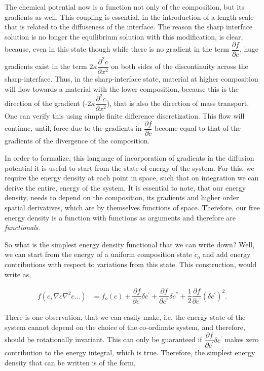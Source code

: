 \documentclass[english]{iambook}
\begin{document}
The chemical potential now is a function not only of the composition, 
but its gradients as well. This coupling is essential, in the introduction
of a length scale that is related to the diffuseness of the interface. 
The reason the sharp interface solution is no longer the equilibrium solution 
with this modification, is clear, because, even in this state though while 
there is no gradient in the 
term $\dfrac{\partial f}{\partial c}$, huge gradients exist in the term 
$2\kappa\dfrac{\partial ^{2}c}{\partial x^{2}}$ on both sides of the discontinuity
across the sharp-interface. Thus, in the sharp-interface state, material at higher 
composition will flow towards a material with the lower composition, because this is the direction of
the gradient (-$2\kappa\dfrac{\partial ^{2}c}{\partial x^{2}}$), that
is also the direction of mass transport. One can verify this using simple finite
difference discretization. This flow will continue, until, force due
to the gradients in $\dfrac{\partial f}{\partial c}$ become equal 
to that of the gradients of the divergence of the composition.

In order to formalize, this language of incorporation of gradients
in the diffusion potential it is useful to start from the state of
energy of the system. For this, we require the energy density at
each point in space, such that on integration we can derive the entire, 
energy of the system. It is essential to note, that our energy density,
needs to depend on the composition, its gradients and higher order
spatial derivatives, which are by themselves functions of space.
Therefore, our free energy density is a function with functions 
as arguments and therefore are \textit{functionals}.

So what is the simplest energy density functional that we 
can write down? Well, we can start from the energy of a uniform
composition state $c_o$ and add energy contributions with respect
to variations from this state. This construction, would write as, 

\begin{align}
 f\left(c, \nabla c \nabla^{2}c \ldots\right) &= f_o\left(c\right) 
 + \dfrac{\partial f}{\partial c^{'}}\delta c^{'} +  \dfrac{\partial f}{\partial c^{''}}\delta c^{''}
 + \dfrac{1}{2} \dfrac{\partial f}{\partial c^{'}}\left(\delta c^{'}\right)^{2}.
\end{align}

There is one observation, that we can easily make, i.e, the energy state
of the system cannot depend on the choice of the co-ordinate system, and therefore, 
should be rotationally invariant. This can only be guaranteed if $\dfrac{\partial f}{\partial c^{'}}\delta c^{'}$
makes zero contribution to the energy integral, which is true. Therefore, the simplest 
energy density that can be written is of the form,
\end{document}
